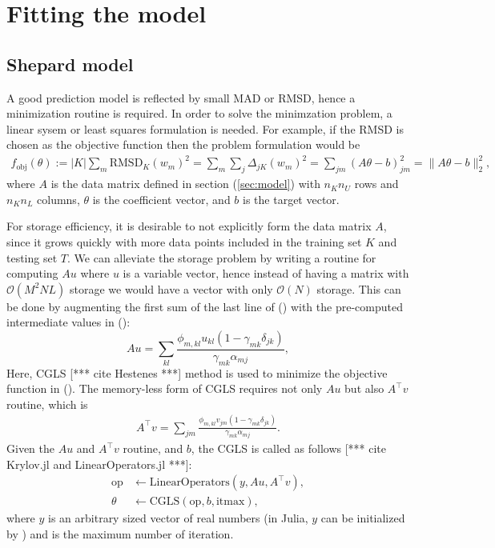 \documentclass[12pt]{article}
\def\att{                    %
        \marginpar[ \hspace*{\fill} \raisebox{-0.2em}{\rule{2mm}{1.2em}} ]
        {\raisebox{-0.2em}{\rule{2mm}{1.2em}} }
        }
\def\at#1{[*** \att #1 ***]}  %
\begin{document}
\section{Fitting the model}
\subsection{Shepard model}
A good prediction model is reflected by small MAD or RMSD, hence a minimization routine is required. In order to solve the minimzation problem, a linear sysem or least squares formulation is needed. For example, if the RMSD is chosen as the objective function then the problem formulation would be
\begin{equation}
    \label{eq:min}
    \begin{split}
        f_{\text{obj}}(\theta):= |K| \sum_m \text{RMSD}_K(w_m)^2 = \sum_m \sum_j \Delta_{jK}(w_m)^2 = \sum_{jm} \left( A\theta - b\right)_{jm}^2
         = \|A \theta - b\|_2^2,
    \end{split}
\end{equation}
where $A$ is the data matrix defined in section (\ref{sec:model}) with $n_Kn_U$ rows and $n_Kn_L$ columns, $\theta$ is the coefficient vector, and $b$ is the target vector.

For storage efficiency, it is desirable to not explicitly form the data matrix $A$, since it grows quickly with more data points included in the training set $K$ and testing set $T$. 
We can alleviate the storage problem by writing a routine for computing $Au$ where $u$ is a variable vector, hence instead of having a matrix with $\mathcal{O}(M^2NL)$ storage we would have a vector with only $\mathcal{O}(N)$ storage. 
This can be done by augmenting the first sum of the last line of () with the pre-computed intermediate values in ():
\begin{equation}
	Au = \sum_{kl} \frac{\phi_{m, kl} u_{kl} (1-\gamma_{m k}\delta_{jk})}{\gamma_{mk}\alpha_{mj}},
\end{equation}
Here, CGLS \at{cite Hestenes} method is used to minimize the objective function in (). The memory-less form of CGLS requires not only $Au$ but also $A^\top v$ routine, which is
\begin{equation}
	\begin{split}
		A^\top v = \sum_{jm} \frac{\phi_{m, kl} v_{jm} (1-\gamma_{m k}\delta_{jk})}{\gamma_{mk}\alpha_{mj}}.
	\end{split}
\end{equation}
Given the $Au$ and $A^\top v$ routine, and $b$, the CGLS is called as follows \at{cite Krylov.jl and LinearOperators.jl}:
\begin{equation*}
	\begin{split}
		\text{op} &\leftarrow \text{LinearOperators}(y, Au, A^\top v), \\
		\theta &\leftarrow \text{CGLS}(\text{op}, b, \text{itmax}),
	\end{split}
\end{equation*}
where $y$ is an arbitrary sized vector of real numbers (in Julia, $y$ can be initialized by ) and  is the maximum number of iteration.
\end{document}

